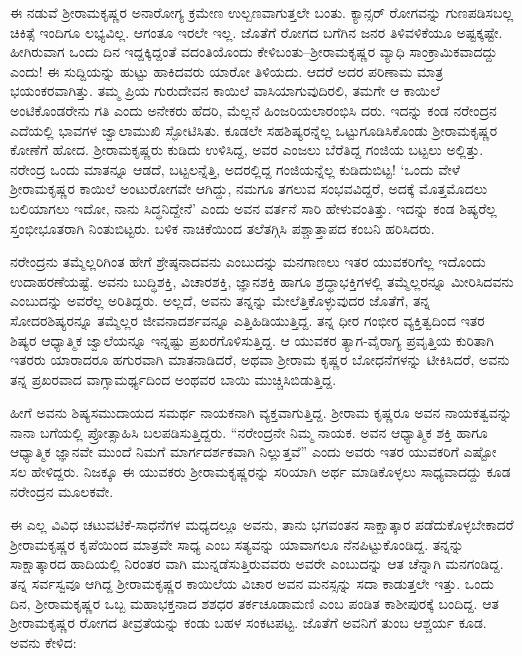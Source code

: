 ಈ ನಡುವೆ ಶ್ರೀರಾಮಕೃಷ್ಣರ ಅನಾರೋಗ್ಯ ಕ್ರಮೇಣ ಉಲ್ಬಣವಾಗುತ್ತಲೇ ಬಂತು. ಕ್ಯಾನ್ಸರ್ ರೋಗವನ್ನು ಗುಣಪಡಿಸಬಲ್ಲ ಚಿಕಿತ್ಸೆ ಇಂದಿಗೂ ಲಭ್ಯವಿಲ್ಲ. ಆಗಂತೂ ಇರಲೇ ಇಲ್ಲ. ಜೊತೆಗೆ ರೋಗದ ಬಗೆಗಿನ ಜನರ ತಿಳಿವಳಿಕೆಯೂ ಅಷ್ಟಕ್ಕಷ್ಟೇ. ಹೀಗಿರುವಾಗ ಒಂದು ದಿನ ಇದ್ದಕ್ಕಿದ್ದಂತೆ ವದಂತಿಯೊಂದು ಕೇಳಿಬಂತು–ಶ್ರೀರಾಮಕೃಷ್ಣರ ವ್ಯಾಧಿ ಸಾಂಕ್ರಾಮಿಕವಾದದ್ದು ಎಂದು! ಈ ಸುದ್ದಿಯನ್ನು ಹುಟ್ಟು ಹಾಕಿದವರು ಯಾರೋ ತಿಳಿಯದು. ಆದರೆ ಅದರ ಪರಿಣಾಮ ಮಾತ್ರ ಭಯಂಕರವಾಗಿತ್ತು. ತಮ್ಮ ಪ್ರಿಯ ಗುರುದೇವನ ಕಾಯಿಲೆ ವಾಸಿಯಾಗುವುದಿರಲಿ, ತಮಗೇ ಆ ಕಾಯಿಲೆ ಅಂಟಿಕೊಂಡರೇನು ಗತಿ ಎಂದು ಅನೇಕರು ಹೆದರಿ, ಮೆಲ್ಲನೆ ಹಿಂಜರಿಯಲಾರಂಭಿಸಿ ದರು. ಇದನ್ನು ಕಂಡ ನರೇಂದ್ರನ ಎದೆಯಲ್ಲಿ ಭಾವಗಳ ಜ್ವಾಲಾಮುಖಿ ಸ್ಫೋಟಿಸಿತು. ಕೂಡಲೇ ಸಹಶಿಷ್ಯರನ್ನೆಲ್ಲ ಒಟ್ಟುಗೂಡಿಸಿಕೊಂಡು ಶ್ರೀರಾಮಕೃಷ್ಣರ ಕೋಣೆಗೆ ಹೋದ. ಶ್ರೀರಾಮಕೃಷ್ಣರು ಕುಡಿದು ಉಳಿಸಿದ್ದ, ಅವರ ಎಂಜಲು ಬೆರೆತಿದ್ದ ಗಂಜಿಯ ಬಟ್ಟಲು ಅಲ್ಲಿತ್ತು. ನರೇಂದ್ರ ಒಂದು ಮಾತನ್ನೂ ಆಡದೆ, ಬಟ್ಟಲನ್ನೆತ್ತಿ, ಅದರಲ್ಲಿದ್ದ ಗಂಜಿಯನ್ನೆಲ್ಲ ಕುಡಿದುಬಿಟ್ಟ! ‘ಒಂದು ವೇಳೆ ಶ್ರೀರಾಮಕೃಷ್ಣರ ಕಾಯಿಲೆ ಅಂಟುರೋಗವೇ ಆಗಿದ್ದು, ನಮಗೂ ತಗಲುವ ಸಂಭವವಿದ್ದರೆ, ಅದಕ್ಕೆ ಮೊತ್ತಮೊದಲು ಬಲಿಯಾಗಲು ಇದೋ, ನಾನು ಸಿದ್ಧನಿದ್ದೇನೆ’ ಎಂದು ಅವನ ವರ್ತನೆ ಸಾರಿ ಹೇಳುವಂತಿತ್ತು. ಇದನ್ನು ಕಂಡ ಶಿಷ್ಯರೆಲ್ಲ ಸ್ತಂಭೀಭೂತರಾಗಿ ನಿಂತುಬಿಟ್ಟರು. ಬಳಿಕ ನಾಚಿಕೆಯಿಂದ ತಲೆತಗ್ಗಿಸಿ ಪಶ್ಚಾತ್ತಾಪದ ಕಂಬನಿ ಹರಿಸಿದರು. 

ನರೇಂದ್ರನು ತಮ್ಮೆಲ್ಲರಿಗಿಂತ ಹೇಗೆ ಶ್ರೇಷ್ಠನಾದವನು ಎಂಬುದನ್ನು ಮನಗಾಣಲು ಇತರ ಯುವಕರಿಗೆಲ್ಲ ಇದೊಂದು ಉದಾಹರಣೆಯಷ್ಟೆ. ಅವನು ಬುದ್ಧಿಶಕ್ತಿ, ವಿಚಾರಶಕ್ತಿ, ಜ್ಞಾನಶಕ್ತಿ ಹಾಗೂ ಶ್ರದ್ಧಾಭಕ್ತಿಗಳಲ್ಲಿ ತಮ್ಮೆಲ್ಲರನ್ನೂ ಮೀರಿಸಿದವನು ಎಂಬುದನ್ನು ಅವರೆಲ್ಲ ಅರಿತಿದ್ದರು. ಅಲ್ಲದೆ, ಅವನು ತನ್ನನ್ನು ಮೇಲೆತ್ತಿಕೊಳ್ಳುವುದರ ಜೊತೆಗೆ, ತನ್ನ ಸೋದರಶಿಷ್ಯರನ್ನೂ ತಮ್ಮೆಲ್ಲರ ಜೀವನಾದರ್ಶವನ್ನೂ ಎತ್ತಿಹಿಡಿಯುತ್ತಿದ್ದ. ತನ್ನ ಧೀರ ಗಂಭೀರ ವ್ಯಕ್ತಿತ್ವದಿಂದ ಇತರ ಶಿಷ್ಯರ ಆಧ್ಯಾತ್ಮಿಕ ಜ್ವಾಲೆಯನ್ನೂ ಇನ್ನಷ್ಟು ಪ್ರಖರಗೊಳಿಸುತ್ತಿದ್ದ. ಆ ಯುವಕರ ತ್ಯಾಗ-ವೈರಾಗ್ಯ ಪ್ರವೃತ್ತಿಯ ಕುರಿತಾಗಿ ಇತರರು ಯಾರಾದರೂ ಹಗುರವಾಗಿ ಮಾತನಾಡಿದರೆ, ಅಥವಾ ಶ್ರೀರಾಮ ಕೃಷ್ಣರ ಬೋಧನೆಗಳನ್ನು ಟೀಕಿಸಿದರೆ, ಅವನು ತನ್ನ ಪ್ರಖರವಾದ ವಾಗ್ಸಾಮರ್ಥ್ಯದಿಂದ ಅಂಥವರ ಬಾಯಿ ಮುಚ್ಚಿಸಿಬಿಡುತ್ತಿದ್ದ.

ಹೀಗೆ ಅವನು ಶಿಷ್ಯಸಮುದಾಯದ ಸಮರ್ಥ ನಾಯಕನಾಗಿ ವ್ಯಕ್ತವಾಗುತ್ತಿದ್ದ. ಶ್ರೀರಾಮ ಕೃಷ್ಣರೂ ಅವನ ನಾಯಕತ್ವವನ್ನು ನಾನಾ ಬಗೆಯಲ್ಲಿ ಪ್ರೋತ್ಸಾಹಿಸಿ ಬಲಪಡಿಸುತ್ತಿದ್ದರು. “ನರೇಂದ್ರನೇ ನಿಮ್ಮ ನಾಯಕ. ಅವನ ಆಧ್ಯಾತ್ಮಿಕ ಶಕ್ತಿ ಹಾಗೂ ಆಧ್ಯಾತ್ಮಿಕ ಜ್ಞಾನವೇ ಮುಂದೆ ನಿಮಗೆ ಮಾರ್ಗದರ್ಶಕವಾಗಿ ನಿಲ್ಲುತ್ತವೆ” ಎಂದು ಅವರು ಇತರ ಯುವಕರಿಗೆ ಎಷ್ಟೋ ಸಲ ಹೇಳಿದ್ದರು. ನಿಜಕ್ಕೂ ಈ ಯುವಕರು ಶ್ರೀರಾಮಕೃಷ್ಣರನ್ನು ಸರಿಯಾಗಿ ಅರ್ಥ ಮಾಡಿಕೊಳ್ಳಲು ಸಾಧ್ಯವಾದದ್ದು ಕೂಡ ನರೇಂದ್ರನ ಮೂಲಕವೇ.

ಈ ಎಲ್ಲ ವಿವಿಧ ಚಟುವಟಿಕೆ-ಸಾಧನೆಗಳ ಮಧ್ಯದಲ್ಲೂ ಅವನು, ತಾನು ಭಗವಂತನ ಸಾಕ್ಷಾತ್ಕಾರ ಪಡೆದುಕೊಳ್ಳಬೇಕಾದರೆ ಶ್ರೀರಾಮಕೃಷ್ಣರ ಕೃಪೆಯಿಂದ ಮಾತ್ರವೇ ಸಾಧ್ಯ ಎಂಬ ಸತ್ಯವನ್ನು ಯಾವಾಗಲೂ ನೆನಪಿಟ್ಟುಕೊಂಡಿದ್ದ. ತನ್ನನ್ನು ಸಾಕ್ಷಾತ್ಕಾರದ ಹಾದಿಯಲ್ಲಿ ನಿರಂತರ ವಾಗಿ ಮುನ್ನಡೆಸುತ್ತಿರುವವರು ಅವರೇ ಎಂಬುದನ್ನು ಆತ ಚೆನ್ನಾಗಿ ಮನಗಂಡಿದ್ದ. ತನ್ನ ಸರ್ವಸ್ವವೂ ಆಗಿದ್ದ ಶ್ರೀರಾಮಕೃಷ್ಣರ ಕಾಯಿಲೆಯ ವಿಚಾರ ಅವನ ಮನಸ್ಸನ್ನು ಸದಾ ಕಾಡುತ್ತಲೇ ಇತ್ತು. ಒಂದು ದಿನ, ಶ್ರೀರಾಮಕೃಷ್ಣರ ಒಬ್ಬ ಮಹಾಭಕ್ತನಾದ ಶಶಧರ ತರ್ಕಚೂಡಾಮಣಿ ಎಂಬ ಪಂಡಿತ ಕಾಶೀಪುರಕ್ಕೆ ಬಂದಿದ್ದ. ಆತ ಶ್ರೀರಾಮಕೃಷ್ಣರ ರೋಗದ ತೀವ್ರತೆಯನ್ನು ಕಂಡು ಬಹಳ ಸಂಕಟಪಟ್ಟ. ಜೊತೆಗೆ ಅವನಿಗೆ ತುಂಬ ಆಶ್ಚರ್ಯ ಕೂಡ. ಅವನು ಕೇಳಿದ:

